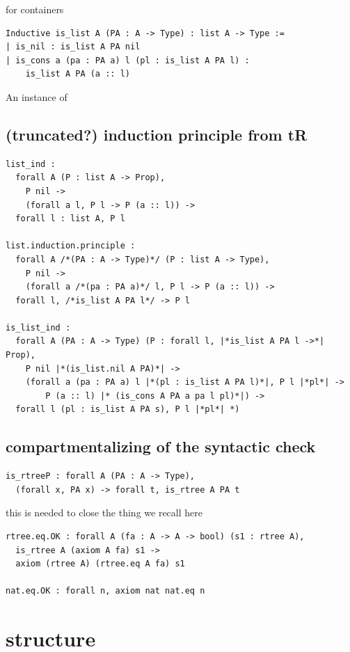 \documentclass[sigplan,10pt,review]{acmart}\settopmatter{printfolios=true,printccs=false,printacmref=false}
\begin{document}
for containers

\begin{lstlisting}
Inductive is_list A (PA : A -> Type) : list A -> Type :=
| is_nil : is_list A PA nil
| is_cons a (pa : PA a) l (pl : is_list A PA l) :
    is_list A PA (a :: l)
\end{lstlisting}

An instance of \cite{keller:hal-00730913}

\subsection{(truncated?) induction principle from tR}

\begin{lstlisting}
list_ind :
  forall A (P : list A -> Prop),
    P nil ->
    (forall a l, P l -> P (a :: l)) ->
  forall l : list A, P l

list.induction.principle :
  forall A /*(PA : A -> Type)*/ (P : list A -> Type),
    P nil ->
    (forall a /*(pa : PA a)*/ l, P l -> P (a :: l)) ->
  forall l, /*is_list A PA l*/ -> P l

is_list_ind :
  forall A (PA : A -> Type) (P : forall l, |*is_list A PA l ->*| Prop),
    P nil |*(is_list.nil A PA)*| ->
    (forall a (pa : PA a) l |*(pl : is_list A PA l)*|, P l |*pl*| ->
        P (a :: l) |* (is_cons A PA a pa l pl)*|) ->
  forall l (pl : is_list A PA s), P l |*pl*| *)

\end{lstlisting}


\subsection{compartmentalizing of the syntactic check}

\begin{lstlisting}
is_rtreeP : forall A (PA : A -> Type),
  (forall x, PA x) -> forall t, is_rtree A PA t
\end{lstlisting}

this is needed to close the thing we recall here

\begin{lstlisting}
rtree.eq.OK : forall A (fa : A -> A -> bool) (s1 : rtree A),
  is_rtree A (axiom A fa) s1 ->
  axiom (rtree A) (rtree.eq A fa) s1

nat.eq.OK : forall n, axiom nat nat.eq n
\end{lstlisting}


\section{structure} %
\end{document}
